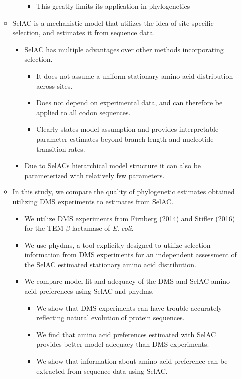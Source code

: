 \documentclass[12pt]{article}
\begin{document}
\begin{itemize}
\begin{itemize}
\begin{itemize}
		\begin{itemize}
			\item This greatly limits its application in phylogenetics
		\end{itemize}
	\end{itemize}
	\item SelAC is a mechanistic model that utilizes the idea of site specific selection, and estimates it from sequence data.
	\begin{itemize}
		\item SelAC has multiple advantages over other methods incorporating selection.
		\begin{itemize}
			\item It does not assume a uniform stationary amino acid distribution across sites.
			\item Does not depend on experimental data, and can therefore be applied to all codon sequences.
			\item Clearly states model assumption and provides interpretable parameter estimates beyond branch length and nucleotide transition rates.
		\end{itemize}
		\item Due to SelACs hierarchical model structure it can also be parameterized with relatively few parameters.
	\end{itemize}
	\item In this study, we compare the quality of phylogenetic estimates obtained utilizing DMS experiments to estimates from SelAC.
	\begin{itemize}
		\item We utilize DMS experiments from Firnberg (2014) and Stifler (2016) for the TEM $\beta$-lactamase of \textit{E. coli}.
		\item We use phydms, a tool explicitly designed to utilize selection information from DMS experiments for an independent assessment of the SelAC estimated stationary amino acid distribution. 
		\item We compare model fit and adequacy of the DMS and SelAC amino acid preferences using SelAC and phydms.
		\begin{itemize}
			\item We show that DMS experiments can have trouble accurately reflecting natural evolution of protein sequences.	
			\item We find that amino acid preferences estimated with SelAC provides better model adequacy than DMS experiments.
			\item We show that information about amino acid preference can be extracted from sequence data using SelAC.
		\end{itemize}	
	\end{itemize}
\end{itemize}


\end{itemize}
\end{document}
